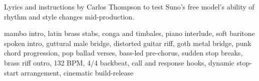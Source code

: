 

\begin{notes}
Lyrics and instructions by Carlos Thompson to test Suno's free model's ability of rhythm and style changes mid-production.
\end{notes}

\begin{style}
mambo intro, latin brass stabs, conga and timbales, piano interlude, soft baritone spoken intro, guttural male bridge, distorted guitar riff, goth metal bridge, punk chord progression, pop ballad verses, bass-led pre-chorus, sudden stop breaks, brass riff outro, 132 BPM, 4/4 backbeat, call and response hooks, dynamic stop-start arrangement, cinematic build-release
\end{style}

